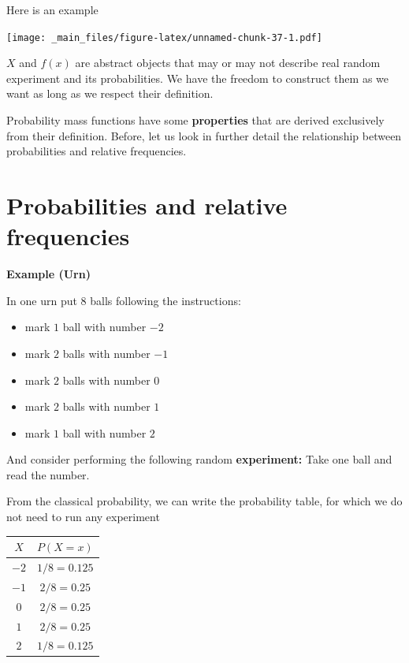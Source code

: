 \documentclass[
]{book}
\providecommand{\tightlist}{%
  \setlength{\itemsep}{0pt}\setlength{\parskip}{0pt}}
\begin{document}
Here is an example

\texttt{[image: \_main\_files/figure-latex/unnamed-chunk-37-1.pdf]}

\(X\) and \(f(x)\) are abstract objects that may or may not describe real random experiment and its probabilities. We have the freedom to construct them as we want as long as we respect their definition.

Probability mass functions have some \textbf{properties} that are derived exclusively from their definition. Before, let us look in further detail the relationship between probabilities and relative frequencies.

\hypertarget{probabilities-and-relative-frequencies}{%
\section{Probabilities and relative frequencies}\label{probabilities-and-relative-frequencies}}

\textbf{Example (Urn)}

In one urn put \(8\) balls following the instructions:

\begin{itemize}
\tightlist
\item
  mark \(1\) ball with number \(-2\)
\item
  mark \(2\) balls with number \(-1\)
\item
  mark \(2\) balls with number \(0\)
\item
  mark \(2\) balls with number \(1\)
\item
  mark \(1\) ball with number \(2\)
\end{itemize}

And consider performing the following random \textbf{experiment:} Take one ball and read the number.

From the classical probability, we can write the probability table, for which we do not need to run any experiment

\begin{longtable}[]{@{}cc@{}}
\toprule\noalign{}
\(X\) & \(P(X=x)\) \\
\midrule\noalign{}
\endhead
\bottomrule\noalign{}
\endlastfoot
\(-2\) & \(1/8=0.125\) \\
\(-1\) & \(2/8=0.25\) \\
\(0\) & \(2/8=0.25\) \\
\(1\) & \(2/8=0.25\) \\
\(2\) & \(1/8=0.125\) \\
\end{longtable}
\end{document}

